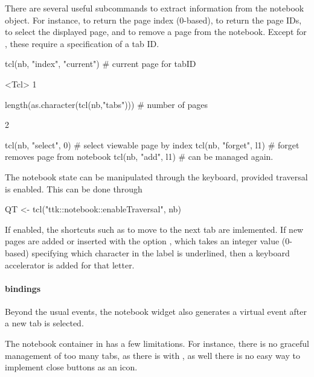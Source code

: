 There are several useful subcommands to extract information from the notebook object.  For instance,  to return the page index (0-based),  to return the page IDs,  to select the displayed page, and  to remove a page from the notebook. Except for , these require a specification of a tab ID.
\begin{Schunk}
\begin{Sinput}
 tcl(nb, "index", "current")           # current page for tabID
\end{Sinput}
\begin{Soutput}
<Tcl> 1 
\end{Soutput}
\begin{Sinput}
 length(as.character(tcl(nb,"tabs")))  # number of pages
\end{Sinput}
\begin{Soutput}
[1] 2
\end{Soutput}
\begin{Sinput}
 tcl(nb, "select", 0)                  # select viewable page by index
 tcl(nb, "forget", l1)                 # forget removes page from notebook
 tcl(nb, "add", l1)                    # can be managed again.
\end{Sinput}
\end{Schunk}


The notebook state can be manipulated through the keyboard, provided traversal is enabled. This can be done through
\begin{Schunk}
\begin{Sinput}
 QT <- tcl("ttk::notebook::enableTraversal", nb)
\end{Sinput}
\end{Schunk}

If enabled, the shortcuts such as  to move to the
next tab are imlemented. If new pages are added or inserted with the
option , which takes an integer value
(0-based) specifying which character in the label is underlined, then
a keyboard accelerator is added for that letter.

\paragraph{bindings}
Beyond the usual events, the 
notebook widget also generates a  virtual event after a new tab is selected. 

The notebook container in \TK\/ has a few limitations. For instance,
there is no graceful management of too many tabs, as there is with
\GTK, as well there is no easy way to implement close buttons as an
icon.



